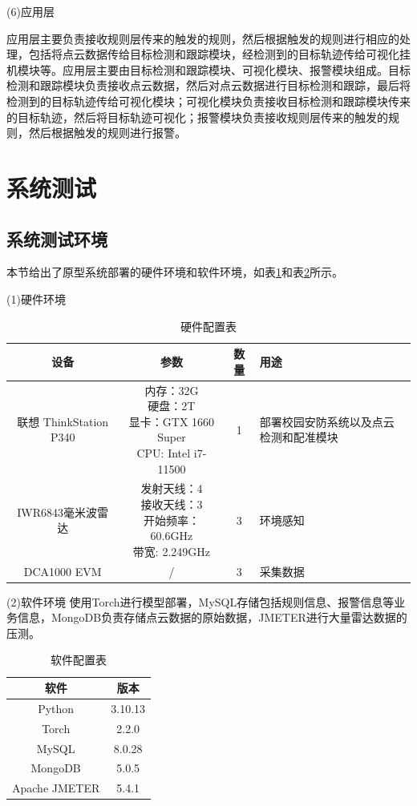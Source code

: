 \par
(6)应用层
\par
应用层主要负责接收规则层传来的触发的规则，然后根据触发的规则进行相应的处理，包括将点云数据传给目标检测和跟踪模块，经检测到的目标轨迹传给可视化挂机模块等。应用层主要由目标检测和跟踪模块、可视化模块、报警模块组成。目标检测和跟踪模块负责接收点云数据，然后对点云数据进行目标检测和跟踪，最后将检测到的目标轨迹传给可视化模块；可视化模块负责接收目标检测和跟踪模块传来的目标轨迹，然后将目标轨迹可视化；报警模块负责接收规则层传来的触发的规则，然后根据触发的规则进行报警。
\section{系统测试}
\subsection{系统测试环境}
本节给出了原型系统部署的硬件环境和软件环境，如表\ref{硬件配置表}和表\ref{软件配置表}所示。
\par
(1)硬件环境
\par
\begin{table}[htbp]
	\centering
	\tabcolsep=3mm
	\caption{硬件配置表}
	\begin{tabular}{cccp{3cm}}
		\toprule
		设备 & 参数 &数量&用途 \\
		\midrule
		联想 ThinkStation P340 & \makecell[l]{内存：32G \\ 硬盘：2T \\ 显卡：GTX 1660 Super \\ CPU: Intel i7-11500} &1 & 部署校园安防系统以及点云检测和配准模块 \\
        IWR6843毫米波雷达 & \makecell[l]{发射天线：4 \\ 接收天线：3 \\ 开始频率：60.6GHz \\ 带宽: 2.249GHz} &3 & 环境感知 \\
        DCA1000 EVM & /  &3 & 采集数据 \\
		\bottomrule
	\end{tabular}
	\label{硬件配置表}
\end{table}

\par
(2)软件环境
使用Torch进行模型部署，MySQL存储包括规则信息、报警信息等业务信息，MongoDB负责存储点云数据的原始数据，JMETER进行大量雷达数据的压测。
\par
\begin{table}[htbp]
	\centering
	\tabcolsep=2cm
	\caption{软件配置表}
	\begin{tabular}{cc}
		\toprule
		软件 & 版本 \\
		\midrule
		Python & 3.10.13 \\
        Torch & 2.2.0  \\
        MySQL & 8.0.28 \\
        MongoDB & 5.0.5 \\
        Apache JMETER & 5.4.1 \\
		\bottomrule
	\end{tabular}
	\label{软件配置表}
\end{table}

